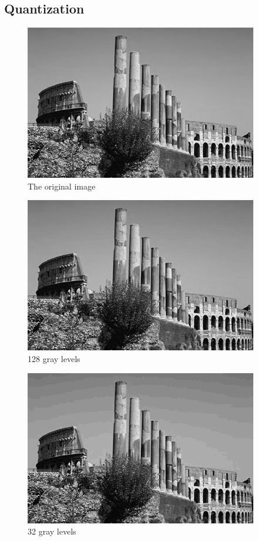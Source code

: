 \documentclass{article}
\begin{document}
\subsection{Quantization}

\begin{figure}[H]
\centering
\includegraphics[width=288pt]{../img/02.png}
\caption{The original image}
\label{quanorigin}
\end{figure}

\begin{figure}[H]
\centering
\includegraphics[width=288pt]{../result/quantize-128.png}
\caption{128 gray levels}
\label{quan128}
\end{figure}

\begin{figure}[H]
\centering
\includegraphics[width=288pt]{../result/quantize-32.png}
\caption{32 gray levels}
\label{quan32}
\end{figure}
\end{document}

